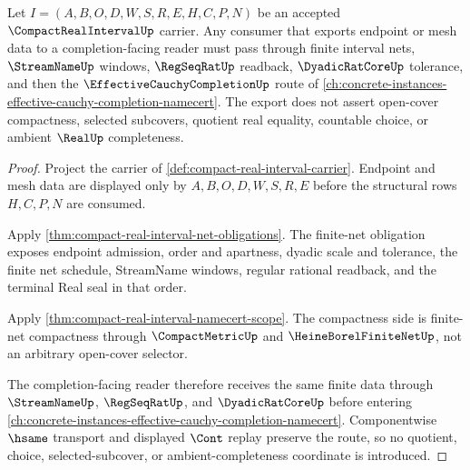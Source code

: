 \begin{theorem}
\label{thm:compact-real-interval-effective-completion-route}
Let $I=(A,B,O,D,W,S,R,E,H,C,P,N)$ be an accepted $\CompactRealIntervalUp$ carrier. Any consumer that exports endpoint or mesh data to a completion-facing reader must pass through finite interval nets, $\StreamNameUp$ windows, $\RegSeqRatUp$ readback, $\DyadicRatCoreUp$ tolerance, and then the $\EffectiveCauchyCompletionUp$ route of \autoref{ch:concrete-instances-effective-cauchy-completion-namecert}. The export does not assert open-cover compactness, selected subcovers, quotient real equality, countable choice, or ambient $\RealUp$ completeness.
\end{theorem}
\begin{proof}
Project the carrier of \autoref{def:compact-real-interval-carrier}. Endpoint and mesh data are displayed only by $A,B,O,D,W,S,R,E$ before the structural rows $H,C,P,N$ are consumed.

Apply \autoref{thm:compact-real-interval-net-obligations}. The finite-net obligation exposes endpoint admission, order and apartness, dyadic scale and tolerance, the finite net schedule, StreamName windows, regular rational readback, and the terminal Real seal in that order.

Apply \autoref{thm:compact-real-interval-namecert-scope}. The compactness side is finite-net compactness through $\CompactMetricUp$ and $\HeineBorelFiniteNetUp$, not an arbitrary open-cover selector.

The completion-facing reader therefore receives the same finite data through $\StreamNameUp$, $\RegSeqRatUp$, and $\DyadicRatCoreUp$ before entering \autoref{ch:concrete-instances-effective-cauchy-completion-namecert}. Componentwise $\hsame$ transport and displayed $\Cont$ replay preserve the route, so no quotient, choice, selected-subcover, or ambient-completeness coordinate is introduced.
\end{proof}



